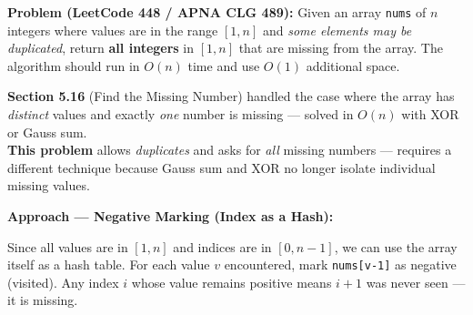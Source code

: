 \documentclass[12pt,a4paper,oneside]{book}
\begin{document}
\textbf{Problem (LeetCode 448 / APNA CLG 489):} Given an array \texttt{nums} of $n$ integers where values are in the range $[1, n]$ and \textit{some elements may be duplicated}, return \textbf{all integers} in $[1, n]$ that are missing from the array. The algorithm should run in $O(n)$ time and use $O(1)$ additional space.

\begin{warningbox}
\textbf{Section 5.16} (Find the Missing Number) handled the case where the array has \textit{distinct} values and exactly \textit{one} number is missing --- solved in $O(n)$ with XOR or Gauss sum.\\[4pt]
\textbf{This problem} allows \textit{duplicates} and asks for \textit{all} missing numbers --- requires a different technique because Gauss sum and XOR no longer isolate individual missing values.
\end{warningbox}

\textbf{Approach --- Negative Marking (Index as a Hash):}

Since all values are in $[1, n]$ and indices are in $[0, n-1]$, we can use the array itself as a hash table. For each value $v$ encountered, mark \texttt{nums[v-1]} as negative (visited). Any index $i$ whose value remains positive means $i+1$ was never seen --- it is missing.
\end{document}
